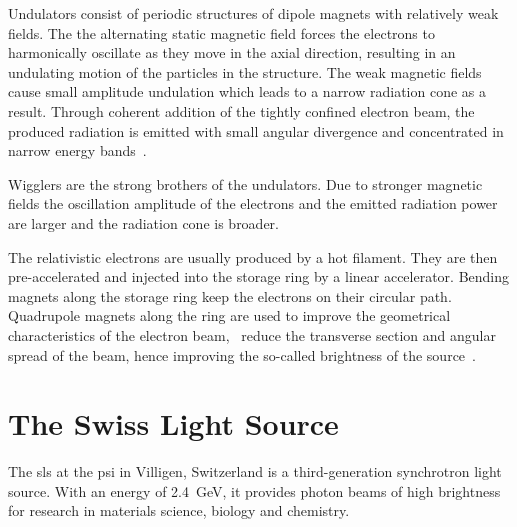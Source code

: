 Undulators consist of periodic structures of dipole magnets with relatively weak fields. The the alternating static magnetic field forces the electrons to harmonically oscillate as they move in the axial direction, resulting in an undulating motion of the particles in the structure. The weak magnetic fields cause small amplitude undulation which leads to a narrow radiation cone as a result. Through coherent addition of the tightly confined electron beam, the produced radiation is emitted with small angular divergence and concentrated in narrow energy bands~\cite{Stampanoni2002a}.

Wigglers are the strong brothers of the undulators. Due to stronger magnetic fields the oscillation amplitude of the electrons and the emitted radiation power are larger and the radiation cone is broader.

The relativistic electrons are usually produced by a hot filament. They are then pre-accelerated and injected into the storage ring by a linear accelerator. Bending magnets along the storage ring keep the electrons on their circular path. Quadrupole magnets along the ring are used to improve the geometrical characteristics of the electron beam, \ie\ reduce the transverse section and angular spread of the beam, hence improving the so-called brightness of the source~\cite{Margaritondo2002}.

\section{The Swiss Light Source}
The \ac{sls} at the \ac{psi} in Villigen, Switzerland is a third-generation synchrotron light source. With an energy of \SI{2.4}{\giga\electronvolt}, it provides photon beams of high brightness for research in materials science, biology and chemistry.

